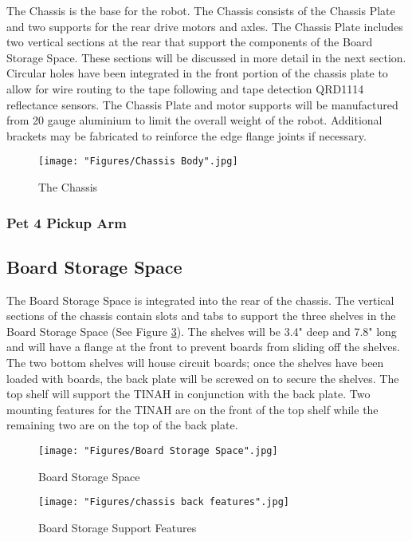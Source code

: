 \documentclass[11pt, oneside]{article} %
\begin{document}
	The Chassis is the base for the robot. The Chassis consists of the Chassis Plate and two supports for the rear drive motors and axles. The Chassis Plate includes two vertical sections at the rear that support the components of the Board Storage Space. These sections will be discussed in more detail in the next section. Circular holes have been integrated in the front portion of the chassis plate to allow for wire routing to the tape following and tape detection QRD1114 reflectance sensors. The Chassis Plate and motor supports will be manufactured from 20 gauge aluminium to limit the overall weight of the robot. Additional brackets may be fabricated to reinforce the edge flange joints if necessary. 

	\begin{figure}[h]
		\centering
		\texttt{[image: "Figures/Chassis Body".jpg]}
		\caption[Chassis]{The Chassis}
		\label{fig:1}
	\end{figure}

	\subsubsection{Pet 4 Pickup Arm}
	
	\subsection{Board Storage Space}

	The Board Storage Space is integrated into the rear of the chassis. The vertical sections of the chassis contain slots and tabs to support the three shelves in the Board Storage Space (See Figure \ref{fig:3}). The shelves will be 3.4" deep and 7.8" long and will have a flange at the front to prevent boards from sliding off the shelves. The two bottom shelves will house circuit boards; once the shelves have been loaded with boards, the back plate will be screwed on to secure the shelves. The top shelf will support the TINAH in conjunction with the back plate. Two mounting features for the TINAH are on the front of the top shelf while the remaining two are on the top of the back plate.

	\begin{figure}[h]
		\centering
		\texttt{[image: "Figures/Board Storage Space".jpg]}
		\caption[Board Storage Space]{Board Storage Space}
		\label{fig:2}
	\end{figure}

	\begin{figure}[h]
		\centering
		\texttt{[image: "Figures/chassis back features".jpg]}
		\caption[Board Storage Support Features]{Board Storage Support Features}
		\label{fig:3}
	\end{figure}
\end{document}
